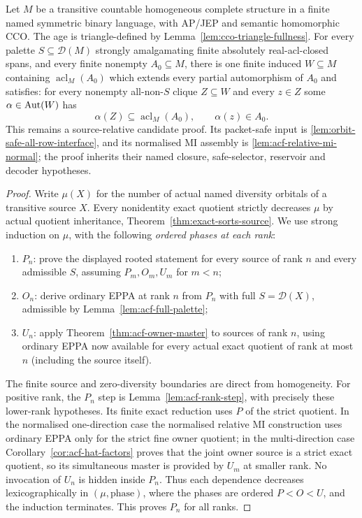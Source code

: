 \begin{theorem}
\label{thm:main-rooted-acf}
Let $M$ be a transitive countable homogeneous complete structure
in a finite named symmetric binary language, with AP/JEP and
semantic homomorphic CCO.  The age is triangle-defined by
Lemma~\ref{lem:cco-triangle-fullness}.  For every palette
$S\subseteq\mathcal D(M)$ strongly amalgamating finite
absolutely real-acl-closed spans, and every finite nonempty
$A_0\subseteq M$, there is one finite induced
$W\subseteq M$ containing $\operatorname{acl}_M(A_0)$
which extends every partial automorphism of $A_0$ and satisfies:
for every nonempty all-non-$S$ clique $Z\subseteq W$
and every $z\in Z$ some $\alpha\in\operatorname{Aut}(W)$ has
\[
 \alpha(Z)\subseteq\operatorname{acl}_M(A_0),
                 \qquad\alpha(z)\in A_0.
\]
This remains a source-relative candidate proof. Its packet-safe input
is \cref{lem:orbit-safe-all-row-interface}, and its normalised MI assembly
is \cref{lem:acf-relative-mi-normal}; the proof inherits their named
closure, safe-selector, reservoir and decoder hypotheses.
\end{theorem}
\begin{proof}
Write $\mu(X)$ for the number of actual named diversity
orbitals of a transitive source $X$.  Every nonidentity
exact quotient strictly decreases $\mu$ by actual
quotient inheritance, Theorem~\ref{thm:exact-sorts-source}.
We use strong induction on $\mu$, with the following
\emph{ordered phases at each rank}:
\begin{enumerate}
\item $P_n$: prove the displayed rooted statement for every
source of rank $n$ and every admissible $S$, assuming
$P_m,O_m,U_m$ for $m<n$;
\item $O_n$: derive ordinary EPPA at rank $n$ from
$P_n$ with full $S=\mathcal D(X)$, admissible by
Lemma~\ref{lem:acf-full-palette};
\item $U_n$: apply Theorem~\ref{thm:acf-owner-master} to
sources of rank $n$, using ordinary EPPA now
available for every actual exact quotient of rank
at most $n$ (including the source itself).
\end{enumerate}
The finite source and zero-diversity boundaries are direct
from homogeneity.  For positive rank, the $P_n$ step is
Lemma~\ref{lem:acf-rank-step}, with precisely these
lower-rank hypotheses.  Its finite exact reduction uses
$P$ of the strict quotient.  In the normalised one-direction
case the normalised relative MI construction uses ordinary
EPPA only for the strict fine owner quotient; in the
multi-direction case Corollary~\ref{cor:acf-hat-factors}
proves that the joint owner source is a strict exact quotient,
so its simultaneous master is provided by $U_m$ at smaller
rank.  No invocation of $U_n$ is hidden inside $P_n$.
Thus each dependence decreases lexicographically in
$(\mu,\text{phase})$, where the phases are ordered
$P<O<U$, and the induction terminates.  This proves
$P_n$ for all ranks.
\end{proof}


